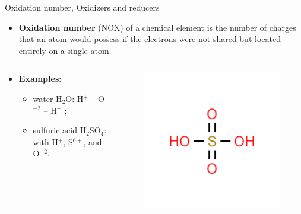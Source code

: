 %
%
\begin{frame}{Oxidation number, Oxidizers and reducers }
	\small
	\begin{itemize}
		\item \alert{\textbf{Oxidation number}} (NOX) of a chemical element is  the number of charges that an atom would 
		possess if the electrons were not shared but located entirely on a single atom.
	\end{itemize}
	\pause 
	\vskip -25pt
	\begin{columns}
		\begin{column}{0.6\textwidth}
			\begin{itemize}
				\item {\bf Examples}: 
				\begin{itemize}
					\item water H$_2$O: H$^+$ -- O$^{-2}$ -- H$^+$ ;
					\item sulfuric acid H$_2$SO$_4$: with H$^+$,  S$^{6+}$, and O$^{-2}$.
				\end{itemize}
			\end{itemize}
		\end{column}
		\begin{column}{0.3\textwidth} 
			\begin{figure}[!t]
				\includegraphics[width=0.8\columnwidth]{figures/chemical-kinetics/sulfuric-acid.png}

\end{figure}
\end{column}
\end{columns}
\end{frame}
